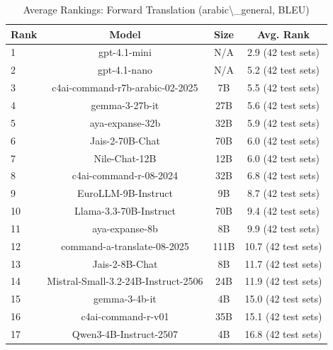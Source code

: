 \begin{table}[htbp]
\centering
\caption{Average Rankings: Forward Translation (arabic\textbackslash{}_general, BLEU)}
\label{tab:avg_rankings_bleu_arabic_general}
\begin{tabular}{l@{\hspace{3pt}}c@{\hspace{3pt}}c@{\hspace{3pt}}c}
\toprule
Rank & Model & Size & Avg. Rank \\
\midrule
1 & gpt-4.1-mini & N/A & 2.9 (42 test sets) \\
2 & gpt-4.1-nano & N/A & 5.2 (42 test sets) \\
3 & c4ai-command-r7b-arabic-02-2025 & 7B & 5.5 (42 test sets) \\
4 & gemma-3-27b-it & 27B & 5.6 (42 test sets) \\
5 & aya-expanse-32b & 32B & 5.9 (42 test sets) \\
6 & Jais-2-70B-Chat & 70B & 6.0 (42 test sets) \\
7 & Nile-Chat-12B & 12B & 6.0 (42 test sets) \\
8 & c4ai-command-r-08-2024 & 32B & 6.8 (42 test sets) \\
9 & EuroLLM-9B-Instruct & 9B & 8.7 (42 test sets) \\
10 & Llama-3.3-70B-Instruct & 70B & 9.4 (42 test sets) \\
11 & aya-expanse-8b & 8B & 9.9 (42 test sets) \\
12 & command-a-translate-08-2025 & 111B & 10.7 (42 test sets) \\
13 & Jais-2-8B-Chat & 8B & 11.7 (42 test sets) \\
14 & Mistral-Small-3.2-24B-Instruct-2506 & 24B & 11.9 (42 test sets) \\
15 & gemma-3-4b-it & 4B & 15.0 (42 test sets) \\
16 & c4ai-command-r-v01 & 35B & 15.1 (42 test sets) \\
17 & Qwen3-4B-Instruct-2507 & 4B & 16.8 (42 test sets) \\
\bottomrule
\end{tabular}
\end{table}
